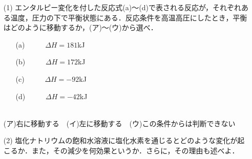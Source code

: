 \documentclass[a4paper,11pt]{ltjsarticle}
\title{}
\author{}
\date{}
\begin{document}
\begin{que}%
\begin{itemize}
    \item [(1)]エンタルピー変化を付した反応式(a)〜(d)で表される反応が，それぞれある温度，圧力の下で平衡状態にある．反応条件を高温高圧にしたとき，平衡はどのように移動するか，(ア)〜(ウ)から選べ．
    \begin{itemize}
        \item [(a)]~~~~~$\varDelta H=181$kJ
        \item [(b)]~~~~~$\varDelta H=172$kJ
        \item [(c)]~~~~~$\varDelta H=-92$kJ
        \item [(d)]~~~~~$\varDelta H=-42$kJ
    \end{itemize}
    　\\
    (ア)右に移動する　(イ)左に移動する　(ウ)この条件からは判断できない
    \item [(2)]塩化ナトリウムの飽和水溶液に塩化水素を通じるとどのような変化が起こるか．また，その減少を何効果というか．さらに，その理由も述べよ．
\end{itemize}
\end{que}
\ans
\newpage
\end{document}
